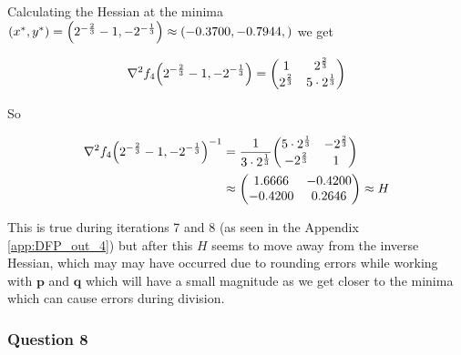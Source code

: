 \documentclass[11pt]{article} %
\let\originalleft\left
\let\originalright\right
\renewcommand{\left}{\mathopen{}\mathclose\bgroup\originalleft}
\renewcommand{\right}{\aftergroup\egroup\originalright}
\begin{document}
Calculating the Hessian at the minima $\left(x^*, y^* \right) = \left(2^{-\frac{2}{3}} -1, -2^{-\frac{1}{3}} \right) \approx \left(-0.3700, -0.7944,\right)$ we get

\begin{equation*}
	\nabla^2 f_4\left(2^{-\frac{2}{3}} -1, -2^{-\frac{1}{3}} \right) =
	\begin{pmatrix}
		1                            & 2^{\frac{2}{3}}    \\
		2^{\frac{2}{3}}    & 5\cdot 2^{\frac{1}{3}}
	\end{pmatrix}
\end{equation*}

So

\begin{align*}
	{\nabla^2 f_4\left(2^{-\frac{2}{3}} -1, -2^{-\frac{1}{3}} \right)}^{-1} = {} & \frac{1}{3 \cdot 2^{\frac{1}{3}}}
	\begin{pmatrix}
		5\cdot 2^{\frac{1}{3}} & -2^{\frac{2}{3}}    \\
		-2^{\frac{2}{3}}           & 1
	\end{pmatrix} \\
	\approx {} & 
	\begin{pmatrix}
		1.6666  & -0.4200    \\
		-0.4200 & 0.2646
	\end{pmatrix}  \approx H\\
\end{align*}

This is true during iterations 7 and 8 (as seen in the Appendix \ref{app:DFP_out_4}) but after this $H$ seems to move away from the inverse Hessian, which may may have occurred due to rounding errors while working with $\mathbf{p}$ and $\mathbf{q}$ which will have a small magnitude as we get closer to the minima which can cause errors during division.

\subsubsection*{Question 8}
\end{document}
